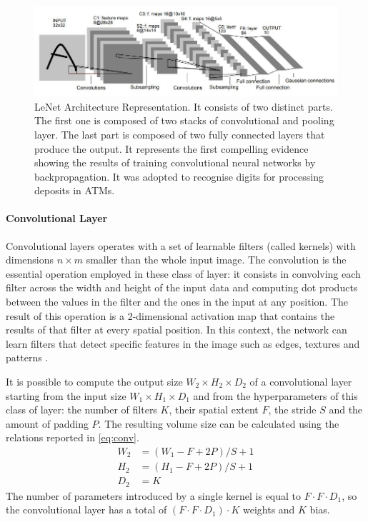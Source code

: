 \begin{figure}[!h]
	\centering
	\includegraphics[width=\textwidth]{img/lenet5.jpg}

	\caption[LeNet Architecture Representation]{LeNet Architecture Representation.
		It consists of two distinct parts.
		The first one is composed of two stacks of convolutional and pooling layer.
		The last part is composed of two fully connected layers that produce the output.
		It represents the first compelling evidence showing the results of training convolutional neural networks by backpropagation.
		It was adopted to recognise digits for processing deposits in ATMs.
		\cite{lecun1998gradient}}
	\label{fig:lenet5}
\end{figure}
\vspace{-10mm} %
\paragraph{Convolutional Layer}

Convolutional layers \cite{lecun1995convolutional} operates with a set of learnable filters (called kernels) with dimensions $n \times m$ smaller than the whole input image.
The convolution is the essential operation employed in these class of layer: it consists in convolving each filter across the width and height of the input data and computing dot products between the values in the filter and the ones in the input at any position.
The result of this operation is a 2-dimensional activation map that contains the results of that filter at every spatial position.
In this context, the network can learn filters that detect specific features in the image such as edges, textures and patterns \cite{erhan2009visualizing}.

It is possible to compute the output size $W_2 \times H_2 \times D_2$ of a convolutional layer starting from the input size $W_1 \times H_1 \times D_1$ and from the hyperparameters of this class of layer: the number of filters $K$, their spatial extent $F$, the stride $S$ and the amount of padding $P$.
The resulting volume size can be calculated using the relations reported in \vref{eq:conv}.
\begin{equation} \label{eq:conv}
	\begin{aligned}
		W_2 & = (W_1 - F + 2P)/S + 1 \\
		H_2 & = (H_1 - F + 2P)/S + 1 \\
		D_2 & = K
	\end{aligned}
\end{equation}
The number of parameters introduced by a single kernel is equal to $F \cdot F \cdot D_1$, so the convolutional layer has a total of $(F \cdot F \cdot D_1) \cdot K$ weights and $K$ bias.

